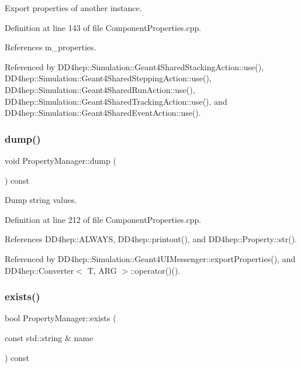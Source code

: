 Export properties of another instance. 



Definition at line 143 of file Component\+Properties.\+cpp.



References m\+\_\+properties.



Referenced by D\+D4hep\+::\+Simulation\+::\+Geant4\+Shared\+Stacking\+Action\+::use(), D\+D4hep\+::\+Simulation\+::\+Geant4\+Shared\+Stepping\+Action\+::use(), D\+D4hep\+::\+Simulation\+::\+Geant4\+Shared\+Run\+Action\+::use(), D\+D4hep\+::\+Simulation\+::\+Geant4\+Shared\+Tracking\+Action\+::use(), and D\+D4hep\+::\+Simulation\+::\+Geant4\+Shared\+Event\+Action\+::use().

\hypertarget{class_d_d4hep_1_1_property_manager_a0b1a0a2e6541ec8e191aa05194f5eac5}{}\label{class_d_d4hep_1_1_property_manager_a0b1a0a2e6541ec8e191aa05194f5eac5} 
\subsubsection{\texorpdfstring{dump()}{dump()}}
{\footnotesize\ttfamily void Property\+Manager\+::dump (\begin{DoxyParamCaption}{ }\end{DoxyParamCaption}) const}



Dump string values. 



Definition at line 212 of file Component\+Properties.\+cpp.



References D\+D4hep\+::\+A\+L\+W\+A\+YS, D\+D4hep\+::printout(), and D\+D4hep\+::\+Property\+::str().



Referenced by D\+D4hep\+::\+Simulation\+::\+Geant4\+U\+I\+Messenger\+::export\+Properties(), and D\+D4hep\+::\+Converter$<$ T, A\+R\+G $>$\+::operator()().

\hypertarget{class_d_d4hep_1_1_property_manager_a5b298c29e29a1a40237a8e5906a22ba4}{}\label{class_d_d4hep_1_1_property_manager_a5b298c29e29a1a40237a8e5906a22ba4} 
\subsubsection{\texorpdfstring{exists()}{exists()}}
{\footnotesize\ttfamily bool Property\+Manager\+::exists (\begin{DoxyParamCaption}\item[{const std\+::string \&}]{name }\end{DoxyParamCaption}) const}



